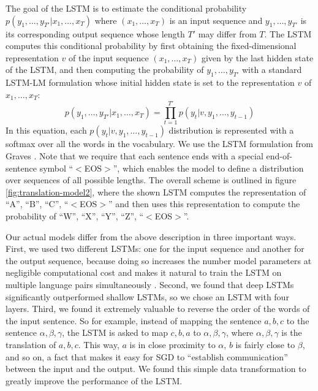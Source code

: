 \documentclass{article}
\begin{document}
The goal of the LSTM is to estimate the conditional probability
$p(y_1,\ldots,y_{T'} | x_1,\ldots,x_T)$ where $(x_1,\ldots,x_T)$ is an
input sequence and $y_1,\ldots,y_{T'}$ is its corresponding output
sequence whose length $T'$ may differ from $T$. The LSTM computes this
conditional probability by first obtaining the fixed-dimensional
representation $v$ of the input sequence $(x_1,\ldots,x_T)$ given by
the last hidden state of the LSTM, and then computing the probability
of $y_1,\ldots,y_{T'}$ with a standard LSTM-LM formulation whose
initial hidden state is set to the representation $v$ of
$x_1,\ldots,x_T$:
\begin{equation}
p(y_1,\ldots,y_{T'} | x_1,\ldots,x_T) = \prod_{t=1}^{T'} p(y_t | v, y_1, \ldots, y_{t-1})
\label{eqn:keyequation}
\end{equation}
In this equation, each $p(y_t | v, y_1, \ldots, y_{t-1})$ distribution
is represented with a softmax over all the words in the
vocabulary.  We use the LSTM formulation from Graves \cite{graves13c}.
Note that we require that each sentence ends with a special
end-of-sentence symbol ``$<$EOS$>$'', which enables the model to define a
distribution over sequences of all possible lengths. The overall
scheme is outlined in figure \ref{fig:translation-model2}, where the
shown LSTM computes the representation of ``A'', ``B'', ``C'', ``$<$EOS$>$''
and then uses this representation to compute the probability of ``W'',
``X'', ``Y'', ``Z'', ``$<$EOS$>$''.

Our actual models differ from the above description in three important
ways.  First, we used two different LSTMs: one for the input sequence
and another for the output sequence, because doing so increases the
number model parameters at negligible computational cost and makes it
natural to train the LSTM on multiple language pairs simultaneously
\cite{kal13}.  Second, we found that deep LSTMs significantly
outperformed shallow LSTMs, so we chose an LSTM with four layers.
Third, we found it extremely valuable to reverse the order of the
words of the input sentence. So for example, instead of mapping the
sentence $a,b,c$ to the sentence $\alpha, \beta, \gamma$, the LSTM is
asked to map $c,b,a$ to $\alpha, \beta, \gamma$, where $\alpha, \beta,
\gamma$ is the translation of $a,b,c$.  This way, $a$ is in close
proximity to $\alpha$, $b$ is fairly close to $\beta$, and so on, a
fact that makes it easy for SGD to ``establish communication'' between
the input and the output.  We found this simple data transformation to
greatly improve the performance of the LSTM.
\end{document}
